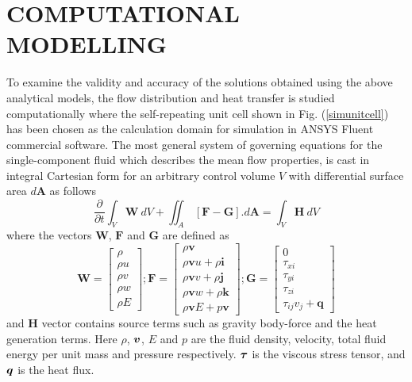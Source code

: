 \documentclass[twocolumn,10pt,cleanfoot]{ihmtc}
\begin{document}
\section{COMPUTATIONAL MODELLING}\label{compmodel}
To examine the validity and accuracy of the solutions obtained using the above analytical models, the flow distribution and heat transfer is studied computationally where the self-repeating unit cell shown in Fig. (\ref{simunitcell}) has been chosen as the calculation domain for simulation in ANSYS Fluent commercial software. The most general system of governing equations for the single-component fluid which describes the mean flow properties, is cast in integral Cartesian form for an arbitrary control volume $V$ with differential surface area $d\boldsymbol{A}$ \cite{fluent} as follows
%
\begin{equation*}
\frac{\partial}{\partial t}\int_{V}\boldsymbol{W\:}dV+\iint_{A}\,[\mathbf{F}-\mathbf{G}].d\boldsymbol{A}=\int_{V}\boldsymbol{H\:}dV 
\end{equation*}
%
where the vectors $\boldsymbol{W}$, $\mathbf{F}$ and $\mathbf{G}$ are defined as 
%
\begin{equation*}
 \boldsymbol{W}=\left[\begin{array}{c} \rho\\ \rho u\\ \rho v\\ \rho w\\ \rho E \end{array}\right] ; \boldsymbol{\mathbf{F}}=\left[\begin{array}{c} \rho\boldsymbol{v}\\ \rho\boldsymbol{v}u+\rho\boldsymbol{i}\\ \rho\boldsymbol{v}v+\rho\boldsymbol{j}\\ \rho\boldsymbol{v}w+\rho\boldsymbol{k}\\ \rho\boldsymbol{v}E+p\boldsymbol{v} \end{array}\right] ; \mathbf{G}=\left[\begin{array}{c} 0\\ \tau_{xi}\\ \tau_{yi}\\ \tau_{zi}\\ \tau_{ij}v_{j}+\boldsymbol{q} \end{array}\right]
\end{equation*}
%
and $\boldsymbol{H}$ vector contains source terms such as gravity body-force and the heat generation terms. Here $\rho$, ${\mbox{\boldmath$v$}}$, $E$ and $p$ are the fluid density, velocity, total fluid energy per unit mass and pressure respectively. ${\mbox{\boldmath$\tau$}}$ is the viscous stress tensor, and ${\mbox{\boldmath$q$}}$ is the heat flux. \\
\end{document}
